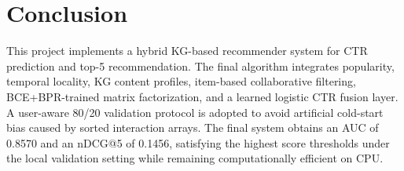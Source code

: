 \documentclass[onecolumn,a4paper,12pt]{IEEEtran}
\begin{document}
\section{Conclusion}

This project implements a hybrid KG-based recommender system for CTR prediction and top-5 recommendation. The final algorithm integrates popularity, temporal locality, KG content profiles, item-based collaborative filtering, BCE+BPR-trained matrix factorization, and a learned logistic CTR fusion layer. A user-aware 80/20 validation protocol is adopted to avoid artificial cold-start bias caused by sorted interaction arrays. The final system obtains an AUC of 0.8570 and an nDCG@5 of 0.1456, satisfying the highest score thresholds under the local validation setting while remaining computationally efficient on CPU.
\end{document}

